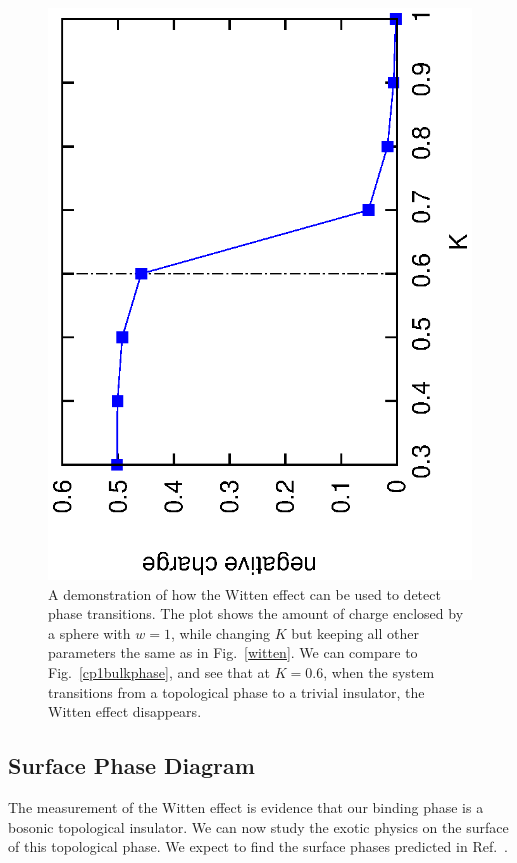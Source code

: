 \documentclass[prb,twocolumn]{revtex4-1}
\newcommand{\scripty}[1]{w}
\begin{document}
\begin{figure}
\includegraphics[angle=-90,width=0.9\linewidth]{figures/wittenphase.eps}
\caption{A demonstration of how the Witten effect can be used to detect phase transitions. The plot shows the amount of charge enclosed by a sphere with $\scripty{r}=1$, while changing $K$ but keeping all other parameters the same as in Fig.~\ref{witten}. We can compare to Fig.~\ref{cp1bulkphase}, and see that at $K=0.6$, when the system transitions from a topological phase to a trivial insulator, the Witten effect disappears.}
\label{wittenphase}
\end{figure}


\subsection{Surface Phase Diagram}

The measurement of the Witten effect is evidence that our binding phase is a bosonic topological insulator. We can now study the exotic physics on the surface of this topological phase. We expect to find the surface phases predicted in Ref.~.
\end{document}
